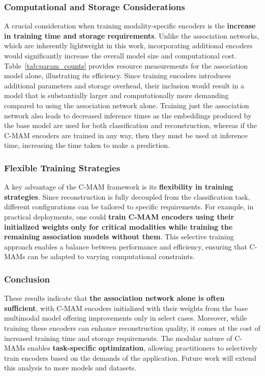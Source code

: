 \subsubsection{Computational and Storage Considerations}
A crucial consideration when training modality-specific encoders is the \textbf{increase in training time and storage requirements}. Unlike the association networks, which are inherently lightweight in this work, incorporating additional encoders would significantly increase the overall model size and computational cost. Table~\ref{tab:param_counts} provides resource measurements for the association model alone, illustrating its efficiency. Since training encoders introduces additional parameters and storage overhead, their inclusion would result in a model that is substantially larger and computationally more demanding compared to using the association network alone. Training just the association network also leads to decreased inference times as the embeddings produced by the base model are used for both classification and reconstruction, whereas if the C-MAM encoders are trained in any way, then they must be used at inference time, increasing the time taken to make a prediction.

\subsubsection{Flexible Training Strategies}
A key advantage of the C-MAM framework is its \textbf{flexibility in training strategies}. Since reconstruction is fully decoupled from the classification task, different configurations can be tailored to specific requirements. For example, in practical deployments, one could \textbf{train C-MAM encoders using their initialized weights only for critical modalities while training the remaining association models without them}. This selective training approach enables a balance between performance and efficiency, ensuring that C-MAMs can be adapted to varying computational constraints.

\subsubsection{Conclusion}
These results indicate that \textbf{the association network alone is often sufficient}, with C-MAM encoders initialized with their weights from the base multimodal model offering improvements only in select cases. Moreover, while training these encoders can enhance reconstruction quality, it comes at the cost of increased training time and storage requirements. The modular nature of C-MAMs enables \textbf{task-specific optimization}, allowing practitioners to selectively train encoders based on the demands of the application. Future work will extend this analysis to more models and datasets. 



